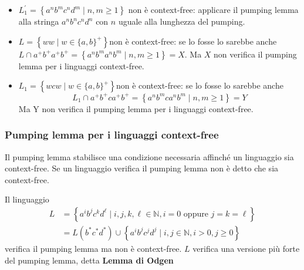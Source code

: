 \begin{itemize}
    \item $L_{1}^{\prime}=\left\{a^{n} b^{m} c^{n} d^{m} \mid n, m \geq 1\right\}$ non è context-free: applicare il pumping lemma alla stringa $a^{n} b^{n} c^{n} d^{n}$ con $n$ uguale alla lunghezza del pumping.
    \item $L=\left\{w w \mid w \in\{a, b\}^{+}\right\}$non è context-free: se lo fosse lo sarebbe anche $L \cap a^{+} b^{+} a^{+} b^{+}=\left\{a^{n} b^{m} a^{n} b^{m} \mid n, m \geq 1\right\}=X$. Ma $X$ non verifica il pumping lemma per i linguaggi context-free.
    \item  $L_{1}=\left\{w c w \mid w \in\{a, b\}^{+}\right\}$non è context-free: se lo fosse lo sarebbe anche
$$
L_{1} \cap a^{+} b^{+} c a^{+} b^{+}=\left\{a^{n} b^{m} c a^{n} b^{m} \mid n, m \geq 1\right\}=Y
$$
Ma Y non verifica il pumping lemma per i linguaggi context-free.
\end{itemize}

\subsubsection{Pumping lemma per i linguaggi context-free}

Il pumping lemma stabilisce una condizione necessaria affinché un
linguaggio sia context-free.
Se un linguaggio verifica il pumping lemma non è detto che sia
context-free.

\vspace{5mm}

Il linguaggio
$$
\begin{aligned}
L &=\left\{a^{i} b^{j} c^{k} d^{\ell} \mid i, j, k, \ell \in \mathbb{N}, i=0 \text { oppure } j=k=\ell\right\} \\
&=L\left(b^{*} c^{*} d^{*}\right) \cup\left\{a^{i} b^{j} c^{j} d^{j} \mid i, j \in \mathbb{N}, i>0, j \geq 0\right\}
\end{aligned}
$$
verifica il pumping lemma ma non è context-free.
$L$ verifica una versione più forte del pumping lemma, detta
\textbf{Lemma di Odgen}





\let\cleardoublepage\clearpage

